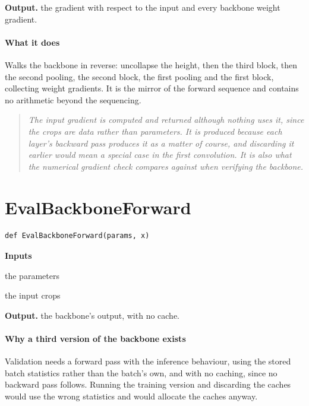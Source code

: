 \noindent\textbf{Output.} the gradient with respect to the input and every backbone weight gradient.


\paragraph{What it does}
Walks the backbone in reverse: uncollapse the height, then the third block, then the second pooling, the second block, the first pooling and the first block, collecting weight gradients. It is the mirror of the forward sequence and contains no arithmetic beyond the sequencing.


\begin{quote}\small\itshape The input gradient is computed and returned although nothing uses it, since the crops are data rather than parameters. It is produced because each layer's backward pass produces it as a matter of course, and discarding it earlier would mean a special case in the first convolution. It is also what the numerical gradient check compares against when verifying the backbone.\end{quote}

\section{EvalBackboneForward}
\begin{lstlisting}[style=sig]
def EvalBackboneForward(params, x)
\end{lstlisting}

\noindent\textbf{Inputs}
\begin{description}[leftmargin=2.2em,style=nextline,font=\normalfont\ttfamily]\setlength\itemsep{1pt}
  \item[{params}] \normalfont the parameters
  \item[{x}] \normalfont the input crops
\end{description}

\noindent\textbf{Output.} the backbone's output, with no cache.


\paragraph{Why a third version of the backbone exists}
Validation needs a forward pass with the inference behaviour, using the stored batch statistics rather than the batch's own, and with no caching, since no backward pass follows. Running the training version and discarding the caches would use the wrong statistics and would allocate the caches anyway.



